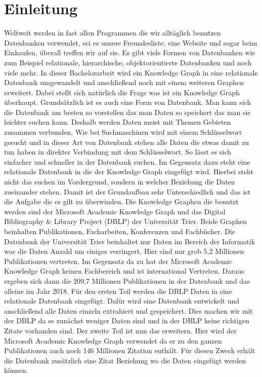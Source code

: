 \section{Einleitung}
Weltweit werden in fast allen Programmen die wir alltäglich benutzen Datenbanken verwendet, sei es unsere Freundesliste, eine Website und sogar beim Einkaufen, überall treffen wir auf sie. Es gibt viele Formen von Datenbanken wie zum Beispiel relationale, hierarchische, objektorientierte Datenbanken und noch viele mehr. In dieser Bachelorarbeit wird ein Knowledge Graph in eine relationale Datenbank umgewandelt und anschließend noch mit einem weiteren Graphen erweitert. Dabei stellt sich natürlich die Frage was ist ein Knowledge Graph überhaupt. Grundsätzlich ist es auch eine Form von Datenbank. Man kann sich die Datenbank am besten so vorstellen das man Daten so speichert das man sie leichter suchen kann. Deshalb werden Daten meist mit Themen Gebieten zusammen verbunden. Wie bei Suchmaschinen wird mit einem Schlüsselwort gesucht und in dieser Art von Datenbank stehen alle Daten die etwas damit zu tun haben in direkter Verbindung mit dem Schlüsselwort. So lässt es sich einfacher und schneller in der Datenbank suchen. Im Gegensatz dazu steht eine relationale Datenbank in die der Knowledge Graph eingefügt wird. Hierbei steht nicht das suchen im Vordergrund, sondern in welcher Beziehung die Daten zueinander stehen. Damit ist der Grundaufbau sehr Unterschiedlich und das ist die Aufgabe die es gilt zu überwinden. Die Knowledge Graphen die benutzt werden sind der Microsoft Academic Knowledge Graph und das Digital Bibliography \& Library Project (DBLP) der Universität Trier. Beide Graphen beinhalten Publikationen, Facharbeiten, Konferenzen und Fachbücher. Die Datenbank der Universität Trier beinhaltet nur Daten im Bereich der Informatik was die Daten Anzahl um einiges verringert. Hier sind nur grob 5,2 Millionen Publikationen vertreten. Im Gegensatz da zu hat der Microsoft Academic Knowledge Graph keinen Fachbereich und ist international Vertreten. Daraus ergeben sich dann die 209,7 Millionen Publikationen in der Datenbank und das alleine im Jahr 2018. Für den ersten Teil werden die DBLP Daten in eine relationale Datenbank eingefügt. Dafür wird eine Datenbank entwickelt und anschließend alle Daten einzeln extrahiert und gespeichert. Dies machen wir mit der DBLP da es zunächst weniger Daten sind und in der DBLP keine richtigen Zitate vorhanden sind. Der zweite Teil ist nun das erweitern. Hier wird der Microsoft Academic Knowledge Graph verwendet da er zu den ganzen Publikationen auch noch 146 Millionen Zitation enthält. Für diesen Zweck erhält die Datenbank zusätzlich eine Zitat Beziehung wo die Daten eingefügt werden können.
